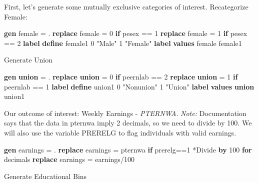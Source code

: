 \documentclass[
]{book}
\newenvironment{Shaded}{\begin{snugshade}}{\end{snugshade}}
\newcommand{\KeywordTok}[1]{\textcolor[rgb]{0.13,0.29,0.53}{\textbf{#1}}}
\newcommand{\NormalTok}[1]{#1}
\newcommand{\StringTok}[1]{\textcolor[rgb]{0.31,0.60,0.02}{#1}}
\begin{document}
First, let's generate some mutually exclusive categories of interest.
Recategorize Female:

\begin{Shaded}
\begin{Highlighting}[]
\KeywordTok{gen}\NormalTok{ female = .}
\KeywordTok{replace}\NormalTok{ female = 0 }\KeywordTok{if}\NormalTok{ pesex == 1}
\KeywordTok{replace}\NormalTok{ female = 1 }\KeywordTok{if}\NormalTok{ pesex == 2}
\KeywordTok{label} \KeywordTok{define}\NormalTok{ female1 0 }\StringTok{"Male"}\NormalTok{ 1 }\StringTok{"Female"}
\KeywordTok{label} \KeywordTok{values}\NormalTok{ female female1}
\end{Highlighting}
\end{Shaded}

Generate Union

\begin{Shaded}
\begin{Highlighting}[]
\KeywordTok{gen} \KeywordTok{union}\NormalTok{ = .}
\KeywordTok{replace} \KeywordTok{union}\NormalTok{ = 0 }\KeywordTok{if}\NormalTok{ peernlab == 2}
\KeywordTok{replace} \KeywordTok{union}\NormalTok{ = 1 }\KeywordTok{if}\NormalTok{ peernlab == 1}
\KeywordTok{label} \KeywordTok{define}\NormalTok{ union1 0 }\StringTok{"Nonunion"}\NormalTok{ 1 }\StringTok{"Union"}
\KeywordTok{label} \KeywordTok{values} \KeywordTok{union}\NormalTok{ union1}
\end{Highlighting}
\end{Shaded}

Our outcome of interest: Weekly Earnings - \emph{PTERNWA}.
\emph{Note:} Documentation says that the data in pternwa imply 2 decimals, so we need to divide by 100. We will also use the variable PRERELG to flag individuals with valid earnings.

\begin{Shaded}
\begin{Highlighting}[]
\KeywordTok{gen}\NormalTok{ earnings = .}
\KeywordTok{replace}\NormalTok{ earnings = pternwa }\KeywordTok{if}\NormalTok{ prerelg==1}
\NormalTok{*Divide }\KeywordTok{by}\NormalTok{ 100 }\KeywordTok{for}\NormalTok{ decimals}
\KeywordTok{replace}\NormalTok{ earnings = earnings/100}
\end{Highlighting}
\end{Shaded}

Generate Educational Bins
\end{document}

